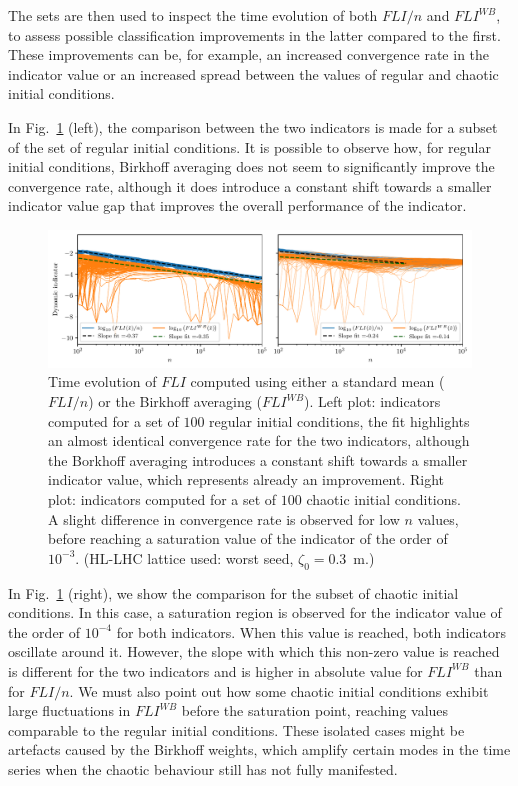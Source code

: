 The sets are then used to inspect the time evolution of both $FLI/n$ and $FLI^{WB}$, to assess possible classification improvements in the latter compared to the first. These improvements can be, for example, an increased convergence rate in the indicator value or an increased spread between the values of regular and chaotic initial conditions.

In Fig.~\ref{fig:fli_compare_mean_birk_2} (left), the comparison between the two indicators is made for a subset of the set of regular initial conditions. It is possible to observe how, for regular initial conditions, Birkhoff averaging does not seem to significantly improve the convergence rate, although it does introduce a constant shift towards a smaller indicator value gap that improves the overall performance of the indicator.

\begin{figure}[htp]
    \centering
    \includegraphics[width=1.0\textwidth]{6_lhc_dynamic_indicators/figs/fli_vs_flibk_idx_2.pdf}
    \caption{Time evolution of $FLI$ computed using either a standard mean ($FLI/n$) or the Birkhoff averaging ($FLI^{WB}$). Left plot: indicators computed for a set of $100$ regular initial conditions, the fit highlights an almost identical convergence rate for the two indicators, although the Borkhoff averaging introduces a constant shift towards a smaller indicator value, which represents already an improvement. Right plot: indicators computed for a set of $100$ chaotic initial conditions. A slight difference in convergence rate is observed for low $n$ values, before reaching a saturation value of the indicator of the order of $10^{-3}$. (HL-LHC lattice used: worst seed, $\zeta_0=$\SI{0.3}{\meter}.)}
    \label{fig:fli_compare_mean_birk_2}
\end{figure}

In Fig.~\ref{fig:fli_compare_mean_birk_2} (right), we show the comparison for the subset of chaotic initial conditions. In this case, a saturation region is observed for the indicator value of the order of $10^{-4}$ for both indicators. When this value is reached, both indicators oscillate around it. However, the slope with which this non-zero value is reached is different for the two indicators and is higher in absolute value for $FLI^{WB}$ than for $FLI/n$. We must also point out how some chaotic initial conditions exhibit large fluctuations in $FLI^{WB}$ before the saturation point, reaching values comparable to the regular initial conditions. These isolated cases might be artefacts caused by the Birkhoff weights, which amplify certain modes in the time series when the chaotic behaviour still has not fully manifested.

